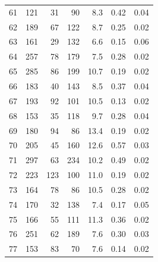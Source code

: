 \begin{tabular}{lrrrrrr}
61 & 121 & 31 & 90 & 8.3 & 0.42 & 0.04 \\
62 & 189 & 67 & 122 & 8.7 & 0.25 & 0.02 \\
63 & 161 & 29 & 132 & 6.6 & 0.15 & 0.06 \\
64 & 257 & 78 & 179 & 7.5 & 0.28 & 0.02 \\
65 & 285 & 86 & 199 & 10.7 & 0.19 & 0.02 \\
66 & 183 & 40 & 143 & 8.5 & 0.37 & 0.04 \\
67 & 193 & 92 & 101 & 10.5 & 0.13 & 0.02 \\
68 & 153 & 35 & 118 & 9.7 & 0.28 & 0.04 \\
69 & 180 & 94 & 86 & 13.4 & 0.19 & 0.02 \\
70 & 205 & 45 & 160 & 12.6 & 0.57 & 0.03 \\
71 & 297 & 63 & 234 & 10.2 & 0.49 & 0.02 \\
72 & 223 & 123 & 100 & 11.0 & 0.19 & 0.02 \\
73 & 164 & 78 & 86 & 10.5 & 0.28 & 0.02 \\
74 & 170 & 32 & 138 & 7.4 & 0.17 & 0.05 \\
75 & 166 & 55 & 111 & 11.3 & 0.36 & 0.02 \\
76 & 251 & 62 & 189 & 7.6 & 0.30 & 0.03 \\
77 & 153 & 83 & 70 & 7.6 & 0.14 & 0.02 \\
\hline
\end{tabular}
